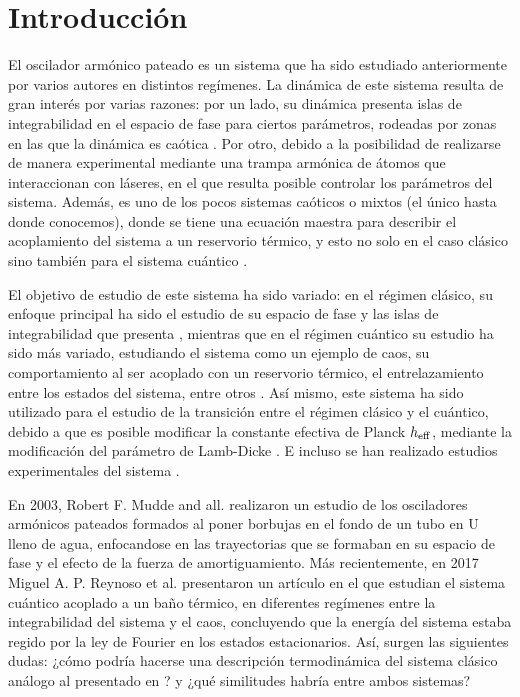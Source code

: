 \documentclass[letterpaper,12pt,oneside]{book}
\begin{document}
	\tableofcontents
	\newpage
	\listoffigures
	\newpage
	
	\newpage
	\setcounter{page}{1}
	
	\chapter{Introducción}
		El oscilador armónico pateado es un sistema que ha sido estudiado anteriormente por varios autores en distintos regímenes. La dinámica de este sistema resulta de gran interés por varias razones: por un lado, su dinámica presenta islas de integrabilidad en el espacio de fase para ciertos parámetros, rodeadas por zonas en las que la dinámica es caótica \cite{1991ProblemChaos}. Por otro, debido a la posibilidad de realizarse de manera experimental mediante una trampa armónica de átomos que interaccionan con l\'aseres, en el que resulta posible controlar los parámetros del sistema\cite{2012Experimental}. Además, es uno de los pocos sistemas caóticos o mixtos (el único hasta donde conocemos), donde se tiene una ecuación maestra para describir el acoplamiento del sistema a un reservorio térmico, y esto no solo en el caso clásico sino también para el sistema cuántico \cite{2017Prado}.
		
		El objetivo de estudio de este sistema ha sido variado: en el régimen clásico, su enfoque principal ha sido el estudio de su espacio de fase y las islas de integrabilidad que presenta \cite{2019dynamics, 2008StabilityChaos}, mientras que en el r\'egimen cu\'antico su estudio ha sido m\'as variado, estudiando el sistema como un ejemplo de caos, su comportamiento al ser acoplado con un reservorio t\'ermico, el entrelazamiento entre los estados del sistema, entre otros \cite{1991ProblemChaos, 2017Prado, 2016Entanglement}. As\'i mismo, este sistema ha sido utilizado para el estudio de la transici\'on entre el r\'egimen cl\'asico y el cu\'antico, debido a que es posible modificar la constante efectiva de Planck $h_{\rm eff}$, mediante la modificaci\'on del par\'ametro de Lamb-Dicke \cite{2004Transition}. E incluso se han realizado estudios experimentales del sistema \cite{1991ProblemChaos, 2017Prado}.
		
		En 2003, Robert F. Mudde and all. realizaron un estudio de los osciladores arm\'onicos pateados formados al poner borbujas en el fondo de un tubo en U lleno de agua, enfocandose en las trayectorias que se formaban en su espacio de fase y el efecto de la fuerza de amortiguamiento. M\'as recientemente, en 2017 Miguel A. P. Reynoso et al. presentaron un art\'iculo en el que estudian el sistema cu\'antico acoplado a un baño t\'ermico, en diferentes reg\'imenes entre la integrabilidad del sistema y el caos, concluyendo que la energ\'ia del sistema estaba regido por la ley de Fourier en los estados estacionarios. As\'i, surgen las siguientes dudas: ¿c\'omo podr\'ia hacerse una descripci\'on termodin\'amica del sistema cl\'asico an\'alogo al presentado en \cite{2017Prado}? y ¿qu\'e similitudes habr\'ia entre ambos sistemas?
		
\end{document}
